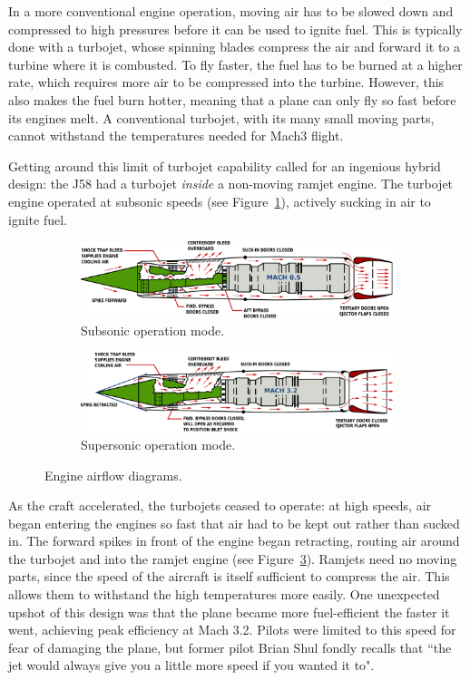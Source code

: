 \documentclass[12pt, draftclsnofoot, onecolumn]{IEEEtran}
\newcommand{\figref}[1]{Figure~\ref{fig:#1}}
\begin{document}
	In a more conventional engine operation, moving air has to be slowed down and compressed to high pressures before it can be used to ignite fuel. This is typically done with a turbojet, whose spinning blades compress the air and forward it to a turbine where it is combusted. To fly faster, the fuel has to be burned at a higher rate, which requires more air to be compressed into the turbine. However, this also makes the fuel burn hotter, meaning that a plane can only fly so fast before its engines melt. A conventional turbojet, with its many small moving parts, cannot withstand the temperatures needed for Mach3 flight.
	
	 Getting around this limit of turbojet capability called for an ingenious hybrid design: the J58 had a turbojet \emph{inside} a non-moving ramjet engine. The turbojet engine operated at subsonic speeds (see \figref{subsonic}), actively sucking in air to ignite fuel.
	 
	\begin{figure}[h]
	\centering
		\begin{subfigure}{0.8\textwidth}
			\includegraphics[width=\textwidth]{mach05.pdf}
			\caption{Subsonic operation mode.}\label{fig:subsonic}
		\end{subfigure}
		\begin{subfigure}{0.8\textwidth}
			\includegraphics[width=\textwidth]{mach32.pdf}
			\caption{Supersonic operation mode.}\label{fig:supersonic}
		\end{subfigure}
		\caption{Engine airflow diagrams.}
	\end{figure}
	
	As the craft accelerated, the turbojets ceased to operate: at high speeds, air began entering the engines so fast that air had to be kept out rather than sucked in. The forward spikes in front of the engine began retracting, routing air around the turbojet and into the ramjet engine (see \figref{supersonic}). Ramjets need no moving parts, since the speed of the aircraft is itself sufficient to compress the air. This allows them to withstand the high temperatures more easily. One unexpected upshot of this design was that the plane became more fuel-efficient the faster it went, achieving peak efficiency at Mach 3.2. Pilots were limited to this speed for fear of damaging the plane, but former pilot Brian Shul fondly recalls that ``the jet would always give you a little more speed if you wanted it to"\cite{sleddriver}.
	
\end{document}
